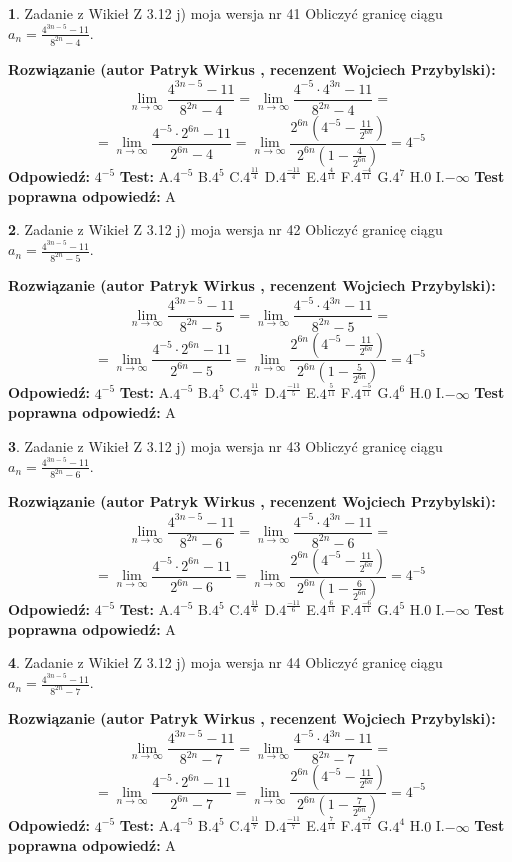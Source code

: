 \documentclass[12pt, a4paper]{article}
\theoremstyle{definition} %
\newtheorem{zad}{}
\newcommand{\zadStart}[1]{\begin{zad}#1\newline}
\newcommand{\zadStop}{\end{zad}}
\newcommand{\rozwStart}[2]{\noindent \textbf{Rozwiązanie (autor #1 , recenzent #2): }\newline}
\newcommand{\rozwStop}{\newline}
\newcommand{\odpStart}{\noindent \textbf{Odpowiedź:}\newline}
\newcommand{\odpStop}{\newline}
\newcommand{\testStart}{\noindent \textbf{Test:}\newline}
\newcommand{\testStop}{\newline}
\newcommand{\kluczStart}{\noindent \textbf{Test poprawna odpowiedź:}\newline}
\newcommand{\kluczStop}{\newline}
\begin{document}
\zadStart{Zadanie z Wikieł Z 3.12 j) moja wersja nr 41}
Obliczyć granicę ciągu $a_{n}=\frac{4^{3n-5}-11}{8^{2n}-4}$.
\zadStop
\rozwStart{Patryk Wirkus}{Wojciech Przybylski}
$$\lim\limits_{n\to\infty}\frac{4^{3n-5}-11}{8^{2n}-4}= \lim\limits_{n\to\infty}\frac{4^{-5} \cdot 4^{3n}-11}{8^{2n}-4}=$$
$$= \lim\limits_{n\to\infty}\frac{4^{-5} \cdot 2^{6n}-11}{2^{6n}-4}= \lim\limits_{n\to\infty}\frac{2^{6n}(4^{-5} - \frac{11}{2^{6n}})}{2^{6n}(1-\frac{4}{2^{6n}})}= 4^{-5}$$
\rozwStop
\odpStart
$4^{-5}$
\odpStop
\testStart
A.$4^{-5}$
B.$4^{5}$
C.$4^{\frac{11}{4}}$
D.$4^{\frac{-11}{4}}$
E.$4^{\frac{4}{11}}$
F.$4^{\frac{-4}{11}}$
G.$4^{7}$
H.$0$
I.$-\infty$
\testStop
\kluczStart
A
\kluczStop



\zadStart{Zadanie z Wikieł Z 3.12 j) moja wersja nr 42}
Obliczyć granicę ciągu $a_{n}=\frac{4^{3n-5}-11}{8^{2n}-5}$.
\zadStop
\rozwStart{Patryk Wirkus}{Wojciech Przybylski}
$$\lim\limits_{n\to\infty}\frac{4^{3n-5}-11}{8^{2n}-5}= \lim\limits_{n\to\infty}\frac{4^{-5} \cdot 4^{3n}-11}{8^{2n}-5}=$$
$$= \lim\limits_{n\to\infty}\frac{4^{-5} \cdot 2^{6n}-11}{2^{6n}-5}= \lim\limits_{n\to\infty}\frac{2^{6n}(4^{-5} - \frac{11}{2^{6n}})}{2^{6n}(1-\frac{5}{2^{6n}})}= 4^{-5}$$
\rozwStop
\odpStart
$4^{-5}$
\odpStop
\testStart
A.$4^{-5}$
B.$4^{5}$
C.$4^{\frac{11}{5}}$
D.$4^{\frac{-11}{5}}$
E.$4^{\frac{5}{11}}$
F.$4^{\frac{-5}{11}}$
G.$4^{6}$
H.$0$
I.$-\infty$
\testStop
\kluczStart
A
\kluczStop



\zadStart{Zadanie z Wikieł Z 3.12 j) moja wersja nr 43}
Obliczyć granicę ciągu $a_{n}=\frac{4^{3n-5}-11}{8^{2n}-6}$.
\zadStop
\rozwStart{Patryk Wirkus}{Wojciech Przybylski}
$$\lim\limits_{n\to\infty}\frac{4^{3n-5}-11}{8^{2n}-6}= \lim\limits_{n\to\infty}\frac{4^{-5} \cdot 4^{3n}-11}{8^{2n}-6}=$$
$$= \lim\limits_{n\to\infty}\frac{4^{-5} \cdot 2^{6n}-11}{2^{6n}-6}= \lim\limits_{n\to\infty}\frac{2^{6n}(4^{-5} - \frac{11}{2^{6n}})}{2^{6n}(1-\frac{6}{2^{6n}})}= 4^{-5}$$
\rozwStop
\odpStart
$4^{-5}$
\odpStop
\testStart
A.$4^{-5}$
B.$4^{5}$
C.$4^{\frac{11}{6}}$
D.$4^{\frac{-11}{6}}$
E.$4^{\frac{6}{11}}$
F.$4^{\frac{-6}{11}}$
G.$4^{5}$
H.$0$
I.$-\infty$
\testStop
\kluczStart
A
\kluczStop



\zadStart{Zadanie z Wikieł Z 3.12 j) moja wersja nr 44}
Obliczyć granicę ciągu $a_{n}=\frac{4^{3n-5}-11}{8^{2n}-7}$.
\zadStop
\rozwStart{Patryk Wirkus}{Wojciech Przybylski}
$$\lim\limits_{n\to\infty}\frac{4^{3n-5}-11}{8^{2n}-7}= \lim\limits_{n\to\infty}\frac{4^{-5} \cdot 4^{3n}-11}{8^{2n}-7}=$$
$$= \lim\limits_{n\to\infty}\frac{4^{-5} \cdot 2^{6n}-11}{2^{6n}-7}= \lim\limits_{n\to\infty}\frac{2^{6n}(4^{-5} - \frac{11}{2^{6n}})}{2^{6n}(1-\frac{7}{2^{6n}})}= 4^{-5}$$
\rozwStop
\odpStart
$4^{-5}$
\odpStop
\testStart
A.$4^{-5}$
B.$4^{5}$
C.$4^{\frac{11}{7}}$
D.$4^{\frac{-11}{7}}$
E.$4^{\frac{7}{11}}$
F.$4^{\frac{-7}{11}}$
G.$4^{4}$
H.$0$
I.$-\infty$
\testStop
\kluczStart
A
\kluczStop
\end{document}
